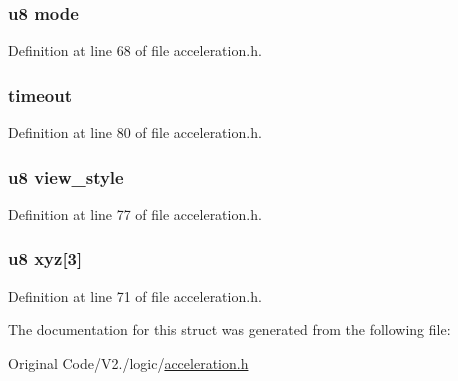 \hypertarget{structaccel_a7cea6ae40aa46b41e3806213a39718c6}{
\subsubsection[{mode}]{\setlength{\rightskip}{0pt plus 5cm}u8 {\bf mode}}}\label{structaccel_a7cea6ae40aa46b41e3806213a39718c6}


\-Definition at line 68 of file acceleration.\-h.

\hypertarget{structaccel_a735bf6536b07682f96c9417b0f1e9079}{
\subsubsection[{timeout}]{ {\bf timeout}}}\label{structaccel_a735bf6536b07682f96c9417b0f1e9079}


\-Definition at line 80 of file acceleration.\-h.

\hypertarget{structaccel_a12daf57ef9d0a0b0e764ac25f7f4f536}{
\subsubsection[{view\-\_\-style}]{\setlength{\rightskip}{0pt plus 5cm}u8 {\bf view\-\_\-style}}}\label{structaccel_a12daf57ef9d0a0b0e764ac25f7f4f536}


\-Definition at line 77 of file acceleration.\-h.

\hypertarget{structaccel_af9cba48daaf1e24eb2df884547c0efcc}{
\subsubsection[{xyz}]{\setlength{\rightskip}{0pt plus 5cm}u8 {\bf xyz}\mbox{[}3\mbox{]}}}\label{structaccel_af9cba48daaf1e24eb2df884547c0efcc}


\-Definition at line 71 of file acceleration.\-h.



\-The documentation for this struct was generated from the following file\-:\begin{DoxyCompactItemize}
\item 
\-Original Code/\-V2./logic/\hyperlink{acceleration_8h}{acceleration.\-h}\end{DoxyCompactItemize}
